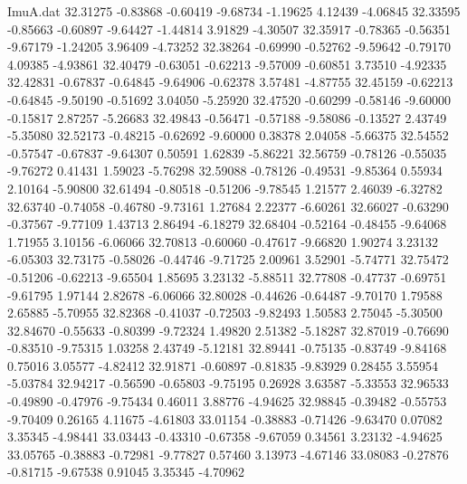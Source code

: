 \begin{filecontents}{ImuA.dat}
  32.31275   -0.83868   -0.60419   -9.68734   -1.19625    4.12439   -4.06845
  32.33595   -0.85663   -0.60897   -9.64427   -1.44814    3.91829   -4.30507
  32.35917   -0.78365   -0.56351   -9.67179   -1.24205    3.96409   -4.73252
  32.38264   -0.69990   -0.52762   -9.59642   -0.79170    4.09385   -4.93861
  32.40479   -0.63051   -0.62213   -9.57009   -0.60851    3.73510   -4.92335
  32.42831   -0.67837   -0.64845   -9.64906   -0.62378    3.57481   -4.87755
  32.45159   -0.62213   -0.64845   -9.50190   -0.51692    3.04050   -5.25920
  32.47520   -0.60299   -0.58146   -9.60000   -0.15817    2.87257   -5.26683
  32.49843   -0.56471   -0.57188   -9.58086   -0.13527    2.43749   -5.35080
  32.52173   -0.48215   -0.62692   -9.60000    0.38378    2.04058   -5.66375
  32.54552   -0.57547   -0.67837   -9.64307    0.50591    1.62839   -5.86221
  32.56759   -0.78126   -0.55035   -9.76272    0.41431    1.59023   -5.76298
  32.59088   -0.78126   -0.49531   -9.85364    0.55934    2.10164   -5.90800
  32.61494   -0.80518   -0.51206   -9.78545    1.21577    2.46039   -6.32782
  32.63740   -0.74058   -0.46780   -9.73161    1.27684    2.22377   -6.60261
  32.66027   -0.63290   -0.37567   -9.77109    1.43713    2.86494   -6.18279
  32.68404   -0.52164   -0.48455   -9.64068    1.71955    3.10156   -6.06066
  32.70813   -0.60060   -0.47617   -9.66820    1.90274    3.23132   -6.05303
  32.73175   -0.58026   -0.44746   -9.71725    2.00961    3.52901   -5.74771
  32.75472   -0.51206   -0.62213   -9.65504    1.85695    3.23132   -5.88511
  32.77808   -0.47737   -0.69751   -9.61795    1.97144    2.82678   -6.06066
  32.80028   -0.44626   -0.64487   -9.70170    1.79588    2.65885   -5.70955
  32.82368   -0.41037   -0.72503   -9.82493    1.50583    2.75045   -5.30500
  32.84670   -0.55633   -0.80399   -9.72324    1.49820    2.51382   -5.18287
  32.87019   -0.76690   -0.83510   -9.75315    1.03258    2.43749   -5.12181
  32.89441   -0.75135   -0.83749   -9.84168    0.75016    3.05577   -4.82412
  32.91871   -0.60897   -0.81835   -9.83929    0.28455    3.55954   -5.03784
  32.94217   -0.56590   -0.65803   -9.75195    0.26928    3.63587   -5.33553
  32.96533   -0.49890   -0.47976   -9.75434    0.46011    3.88776   -4.94625
  32.98845   -0.39482   -0.55753   -9.70409    0.26165    4.11675   -4.61803
  33.01154   -0.38883   -0.71426   -9.63470    0.07082    3.35345   -4.98441
  33.03443   -0.43310   -0.67358   -9.67059    0.34561    3.23132   -4.94625
  33.05765   -0.38883   -0.72981   -9.77827    0.57460    3.13973   -4.67146
  33.08083   -0.27876   -0.81715   -9.67538    0.91045    3.35345   -4.70962

\end{filecontents}

